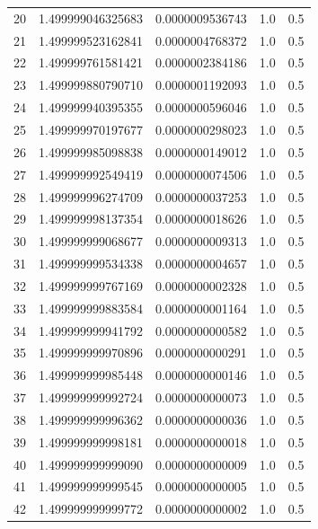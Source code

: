 \documentclass[titlepage,a4paper]{article}
\begin{document}
\begin{center}
\begin{tabular}{| c | l | c | c | c |}
        20      & 1.499999046325683  &  0.0000009536743  &  1.0  &  0.5 \\
        21      & 1.499999523162841  &  0.0000004768372  &  1.0  &  0.5 \\
        22      & 1.499999761581421  &  0.0000002384186  &  1.0  &  0.5 \\
        23      & 1.499999880790710  &  0.0000001192093  &  1.0  &  0.5 \\
        24      & 1.499999940395355  &  0.0000000596046  &  1.0  &  0.5 \\
        25      & 1.499999970197677  &  0.0000000298023  &  1.0  &  0.5 \\
        26      & 1.499999985098838  &  0.0000000149012  &  1.0  &  0.5 \\
        27      & 1.499999992549419  &  0.0000000074506  &  1.0  &  0.5 \\
        28      & 1.499999996274709  &  0.0000000037253  &  1.0  &  0.5 \\
        29      & 1.499999998137354  &  0.0000000018626  &  1.0  &  0.5 \\
        30      & 1.499999999068677  &  0.0000000009313  &  1.0  &  0.5 \\
        31      & 1.499999999534338  &  0.0000000004657  &  1.0  &  0.5 \\
        32      & 1.499999999767169  &  0.0000000002328  &  1.0  &  0.5 \\
        33      & 1.499999999883584  &  0.0000000001164  &  1.0  &  0.5 \\
        34      & 1.499999999941792  &  0.0000000000582  &  1.0  &  0.5 \\
        35      & 1.499999999970896  &  0.0000000000291  &  1.0  &  0.5 \\
        36      & 1.499999999985448  &  0.0000000000146  &  1.0  &  0.5 \\
        37      & 1.499999999992724  &  0.0000000000073  &  1.0  &  0.5 \\
        38      & 1.499999999996362  &  0.0000000000036  &  1.0  &  0.5 \\
        39      & 1.499999999998181  &  0.0000000000018  &  1.0  &  0.5 \\
        40      & 1.499999999999090  &  0.0000000000009  &  1.0  &  0.5 \\
        41      & 1.499999999999545  &  0.0000000000005  &  1.0  &  0.5 \\
        42      & 1.499999999999772  &  0.0000000000002  &  1.0  &  0.5 \\
        \hline
    \end{tabular}
\end{center}
\end{document}
